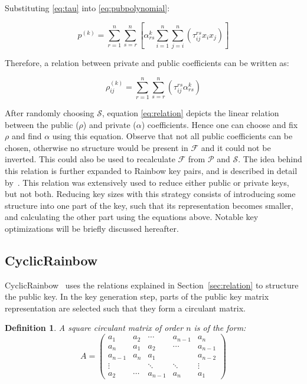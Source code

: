 \documentclass{ufsctex/ufsctex}
\newtheorem{definition}{Definition}
\begin{document}
Substituting \ref{eq:tau} into \ref{eq:pubpolynomial}:

\begin{equation}
p^{(k)} = \sum_{r=1}^n \sum_{s=r}^n
\left[
\alpha^{k}_{rs} \sum_{i=1}^{n}\sum_{j=i}^n \left( \tau^{rs}_{ij} x_i x_j \right)
\right]
\end{equation}

Therefore, a relation between private and public coefficients can be written as:

\begin{equation}\label{eq:relation}
\rho^{(k)}_{ij} = \sum_{r=1}^{n}\sum_{s=r}^n
\left( \tau^{rs}_{ij} \alpha^{k}_{rs} \right)
\end{equation}

After randomly choosing $\mathcal{S}$, equation \ref{eq:relation} depicts the
linear relation between the public ($\rho$) and private ($\alpha$)
coefficients. Hence one can choose and fix $\rho$ and find $\alpha$ using this
equation. Observe that not all public coefficients can be chosen, otherwise no
structure would be present in $\mathcal{F}$ and it could not be inverted. This
could also be used to recalculate $\mathcal{F}$ from $\mathcal{P}$ and
$\mathcal{S}$. The idea behind this relation is further expanded to Rainbow key
pairs, and is described in detail by~\cite{petzoldt2011small}. This relation
was extensively used to reduce either public or private keys, but not both.
Reducing key sizes with this strategy consists of introducing some structure
into one part of the key, such that its representation becomes smaller, and
calculating the other part using the equations above. Notable key optimizations
will be briefly discussed hereafter.

\subsection{CyclicRainbow}

CyclicRainbow~\cite{petzoldt2010cyclicrainbow} uses the relations explained in
Section~\ref{sec:relation} to structure the public key. In the key generation
step, parts of the public key matrix representation are selected such that they
form a circulant matrix.

\begin{definition}
A square circulant matrix of order $n$ is of the form:
\begin{equation}
A =
\begin{pmatrix}
a_1     & a_2    & \cdots  & a_{n-1} & a_n     \\
a_n     & a_1    & a_2     & \cdots  & a_{n-1} \\
a_{n-1} & a_n    & a_1     &         & a_{n-2} \\
\vdots  &        & \ddots  & \ddots  & \vdots  \\
a_2     & \cdots & a_{n-1} & a_n     & a_1
\end{pmatrix}
\end{equation}
\end{definition}
\end{document}
